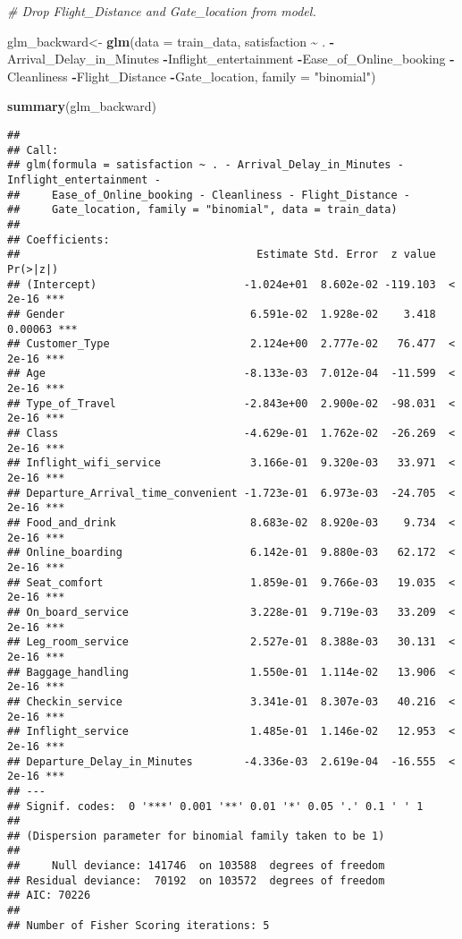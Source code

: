 \documentclass[
]{article}
\newenvironment{Shaded}{\begin{snugshade}}{\end{snugshade}}
\newcommand{\AttributeTok}[1]{\textcolor[rgb]{0.13,0.29,0.53}{#1}}
\newcommand{\CommentTok}[1]{\textcolor[rgb]{0.56,0.35,0.01}{\textit{#1}}}
\newcommand{\FunctionTok}[1]{\textcolor[rgb]{0.13,0.29,0.53}{\textbf{#1}}}
\newcommand{\NormalTok}[1]{#1}
\newcommand{\OtherTok}[1]{\textcolor[rgb]{0.56,0.35,0.01}{#1}}
\newcommand{\SpecialCharTok}[1]{\textcolor[rgb]{0.81,0.36,0.00}{\textbf{#1}}}
\newcommand{\StringTok}[1]{\textcolor[rgb]{0.31,0.60,0.02}{#1}}
\begin{document}
\begin{Shaded}
\begin{Highlighting}[]
\CommentTok{\# Drop Flight\_Distance and Gate\_location from model.}

\NormalTok{glm\_backward}\OtherTok{\textless{}{-}} \FunctionTok{glm}\NormalTok{(}\AttributeTok{data =}\NormalTok{ train\_data,}
\NormalTok{                satisfaction }\SpecialCharTok{\textasciitilde{}}\NormalTok{ .}
                \SpecialCharTok{{-}}\NormalTok{Arrival\_Delay\_in\_Minutes}
                \SpecialCharTok{{-}}\NormalTok{Inflight\_entertainment}
                \SpecialCharTok{{-}}\NormalTok{Ease\_of\_Online\_booking }
                \SpecialCharTok{{-}}\NormalTok{Cleanliness}
                \SpecialCharTok{{-}}\NormalTok{Flight\_Distance}
                \SpecialCharTok{{-}}\NormalTok{Gate\_location,}
                \AttributeTok{family =} \StringTok{"binomial"}\NormalTok{)}

\FunctionTok{summary}\NormalTok{(glm\_backward)}
\end{Highlighting}
\end{Shaded}

\begin{verbatim}
## 
## Call:
## glm(formula = satisfaction ~ . - Arrival_Delay_in_Minutes - Inflight_entertainment - 
##     Ease_of_Online_booking - Cleanliness - Flight_Distance - 
##     Gate_location, family = "binomial", data = train_data)
## 
## Coefficients:
##                                     Estimate Std. Error  z value Pr(>|z|)    
## (Intercept)                       -1.024e+01  8.602e-02 -119.103  < 2e-16 ***
## Gender                             6.591e-02  1.928e-02    3.418  0.00063 ***
## Customer_Type                      2.124e+00  2.777e-02   76.477  < 2e-16 ***
## Age                               -8.133e-03  7.012e-04  -11.599  < 2e-16 ***
## Type_of_Travel                    -2.843e+00  2.900e-02  -98.031  < 2e-16 ***
## Class                             -4.629e-01  1.762e-02  -26.269  < 2e-16 ***
## Inflight_wifi_service              3.166e-01  9.320e-03   33.971  < 2e-16 ***
## Departure_Arrival_time_convenient -1.723e-01  6.973e-03  -24.705  < 2e-16 ***
## Food_and_drink                     8.683e-02  8.920e-03    9.734  < 2e-16 ***
## Online_boarding                    6.142e-01  9.880e-03   62.172  < 2e-16 ***
## Seat_comfort                       1.859e-01  9.766e-03   19.035  < 2e-16 ***
## On_board_service                   3.228e-01  9.719e-03   33.209  < 2e-16 ***
## Leg_room_service                   2.527e-01  8.388e-03   30.131  < 2e-16 ***
## Baggage_handling                   1.550e-01  1.114e-02   13.906  < 2e-16 ***
## Checkin_service                    3.341e-01  8.307e-03   40.216  < 2e-16 ***
## Inflight_service                   1.485e-01  1.146e-02   12.953  < 2e-16 ***
## Departure_Delay_in_Minutes        -4.336e-03  2.619e-04  -16.555  < 2e-16 ***
## ---
## Signif. codes:  0 '***' 0.001 '**' 0.01 '*' 0.05 '.' 0.1 ' ' 1
## 
## (Dispersion parameter for binomial family taken to be 1)
## 
##     Null deviance: 141746  on 103588  degrees of freedom
## Residual deviance:  70192  on 103572  degrees of freedom
## AIC: 70226
## 
## Number of Fisher Scoring iterations: 5
\end{verbatim}
\end{document}
